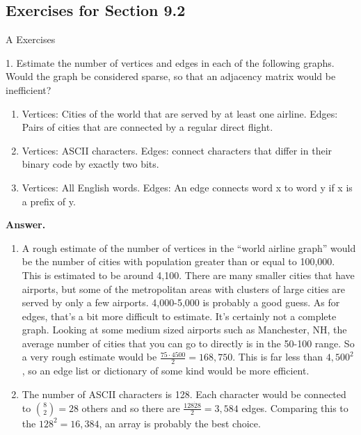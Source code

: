 \documentclass[10pt,]{book}
\theoremstyle{plain}
\theoremstyle{definition}
\theoremstyle{definition}
\theoremstyle{definition}
\theoremstyle{definition}
\theoremstyle{definition}
\numberwithin{equation}{section}
\begin{document}
\subsection[Exercises for Section 9.2]{Exercises for Section 9.2}\label{exercises-9-2}
\hypertarget{exercisegroup-2}{}\typeout{************************************************}
\typeout{************************************************}
A Exercises%
\begin{exercisegroup}
\item[1.]\hypertarget{exercise-12}{}Estimate the number of vertices and edges in each of the following graphs. Would the graph be considered sparse, so that an adjacency matrix would be inefficient?%
\par
\leavevmode%
\begin{enumerate}[label=\alph*]
\item\hypertarget{li-26}{} Vertices: Cities of the world that are served by at least one airline. 
  Edges: Pairs of cities that are connected by a regular direct flight.%
\item\hypertarget{li-27}{} Vertices: ASCII characters. 
 Edges: connect characters that differ in their binary code by exactly two bits.%
\item\hypertarget{li-28}{} Vertices: All English words. 
 Edges: An edge connects word x to word y if x is a prefix of y.%
\end{enumerate}
%
\par\smallskip
\par\smallskip
\noindent\textbf{Answer.}\hypertarget{answer-1}{}\quad
\leavevmode%
\begin{enumerate}[label=\alph*]
\item\hypertarget{li-29}{}  A rough estimate of the number of vertices in the ``world airline graph'' would be the number of cities with population greater than or equal to 100,000. This is estimated to be around 4,100. There are many smaller cities that have airports, but some of the metropolitan areas with clusters of large cities are served by only a few airports.  4,000-5,000 is probably a good guess.   As for edges, that's a bit more difficult to estimate.  It's certainly not  a complete graph.  Looking at some medium sized airports such as Manchester, NH, the average number of cities that you can go to directly is in the 50-100 range.   So a very
rough estimate would be   \(\frac{75 \cdot  4500}{2}=168,750\). This is far less than \(4,500^2\), so an edge list or dictionary of some kind would be more efficient. %
\item\hypertarget{li-30}{} The number of ASCII characters is 128.  Each character would be connected to \(\binom{8}{2}=28\) others and so there are \(\frac{128 \dot 28}{2}=3,584\)  edges.  Comparing this to the \(128^2=16,384\), an array is probably the best choice.

\end{enumerate}
\end{exercisegroup}
\end{document}
